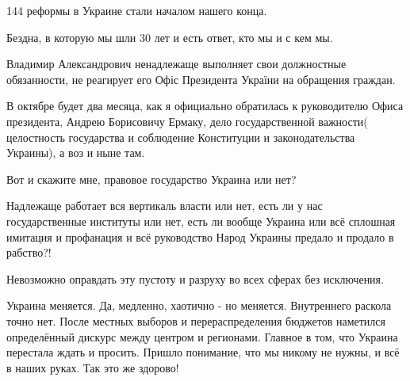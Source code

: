 \begin{itemize}
144 реформы в Украине стали началом нашего конца.

Бездна, в которую мы шли 30 лет и есть ответ, кто мы и с кем мы.

Владимир Александрович ненадлежаще выполняет свои должностные обязанности, не
реагирует его Офіс Президента України на обращения граждан.

В октябре будет два месяца, как я официально обратилась к руководителю Офиса
президента, Андрею Борисовичу Ермаку, дело государственной важности(
целостность государства и соблюдение Конституции и законодательства Украины), а
воз и ныне там.

Вот и скажите мне, правовое государство Украина или нет?

Надлежаще работает вся вертикаль власти или нет, есть ли у нас государственные
институты или нет, есть ли вообще Украина или всё сплошная имитация и
профанация и всё руководство Народ Украины предало и продало в рабство?!

Невозможно оправдать эту пустоту и разруху во всех сферах без исключения.


Украина меняется. Да, медленно, хаотично - но меняется. Внутреннего раскола
точно нет. После местных выборов и перераспределения бюджетов наметился
определённый дискурс между центром и регионами. Главное в том, что Украина
перестала ждать и просить. Пришло понимание, что мы никому не нужны, и всё в
наших руках. Так это же здорово!


\end{itemize} %

